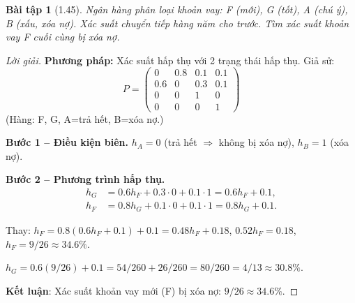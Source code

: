 \documentclass[8pt,a4paper]{article}
\newtheorem{exercise}{Bài tập}
\newenvironment{solution}{\begin{proof}[Lời giải]}{\end{proof}}
\begin{document}
\begin{exercise}[1.45]
Ngân hàng phân loại khoản vay: F (mới), G (tốt), A (chú ý), B (xấu, xóa nợ). Xác suất chuyển tiếp hàng năm cho trước. Tìm xác suất khoản vay F cuối cùng bị xóa nợ.
\end{exercise}
\begin{solution}
\textbf{Phương pháp:} Xác suất hấp thụ với 2 trạng thái hấp thụ. Giả sử:
\[
  P = \begin{pmatrix} 0 & 0.8 & 0.1 & 0.1 \\ 0.6 & 0 & 0.3 & 0.1 \\ 0 & 0 & 1 & 0 \\ 0 & 0 & 0 & 1 \end{pmatrix}
\]
(Hàng: F, G, A=trả hết, B=xóa nợ.)

\textbf{Bước 1 -- Điều kiện biên.} $h_A = 0$ (trả hết $\Rightarrow$ không bị xóa nợ), $h_B = 1$ (xóa nợ).

\textbf{Bước 2 -- Phương trình hấp thụ.}
\begin{align*}
  h_G &= 0.6 h_F + 0.3 \cdot 0 + 0.1 \cdot 1 = 0.6 h_F + 0.1, \\
  h_F &= 0.8 h_G + 0.1 \cdot 0 + 0.1 \cdot 1 = 0.8 h_G + 0.1.
\end{align*}

Thay: $h_F = 0.8(0.6 h_F + 0.1) + 0.1 = 0.48 h_F + 0.18$, $0.52 h_F = 0.18$, $h_F = 9/26 \approx 34.6\%$.

$h_G = 0.6(9/26) + 0.1 = 54/260 + 26/260 = 80/260 = 4/13 \approx 30.8\%$.

\textbf{Kết luận}: Xác suất khoản vay mới (F) bị xóa nợ: $9/26 \approx 34.6\%$.
\end{solution}
\end{document}
